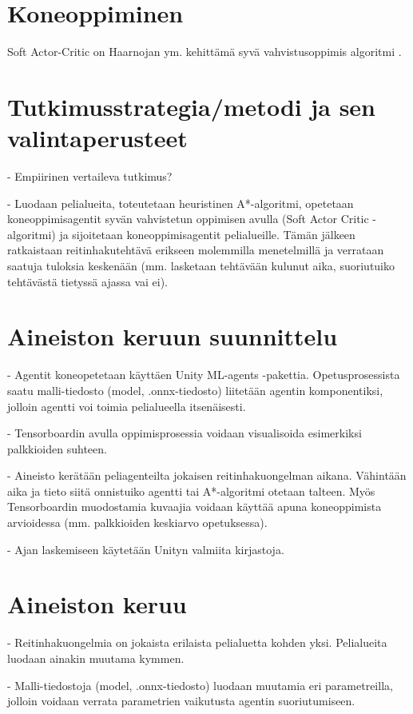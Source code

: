 \documentclass[utf8]{gradu3}
\begin{document}
\chapter{Koneoppiminen}

Soft Actor-Critic on Haarnojan ym. kehittämä syvä vahvistusoppimis algoritmi \parencite{haarnoja2018soft}. 

\chapter{Tutkimusstrategia/metodi ja sen valintaperusteet}

- Empiirinen vertaileva tutkimus?

- Luodaan pelialueita, toteutetaan heuristinen A*-algoritmi, opetetaan koneoppimisagentit syvän vahvistetun oppimisen avulla (Soft Actor Critic -algoritmi)
ja sijoitetaan koneoppimisagentit pelialueille. Tämän jälkeen ratkaistaan reitinhakutehtävä erikseen molemmilla menetelmillä ja verrataan saatuja tuloksia keskenään
(mm. lasketaan tehtävään kulunut aika, suoriutuiko tehtävästä tietyssä ajassa vai ei).

\chapter{Aineiston keruun suunnittelu}

- Agentit koneopetetaan käyttäen Unity ML-agents -pakettia. Opetusprosessista saatu malli-tiedosto (model, .onnx-tiedosto) liitetään agentin
komponentiksi, jolloin agentti voi toimia pelialueella itsenäisesti.

- Tensorboardin avulla oppimisprosessia voidaan visualisoida esimerkiksi palkkioiden suhteen.

- Aineisto kerätään peliagenteilta jokaisen reitinhakuongelman aikana. Vähintään aika ja tieto siitä onnistuiko agentti tai A*-algoritmi otetaan talteen.
Myös Tensorboardin muodostamia kuvaajia voidaan käyttää apuna koneoppimista arvioidessa (mm. palkkioiden keskiarvo opetuksessa).

- Ajan laskemiseen käytetään Unityn valmiita kirjastoja.

\chapter{Aineiston keruu}

- Reitinhakuongelmia on jokaista erilaista pelialuetta kohden yksi. Pelialueita luodaan ainakin muutama kymmen.

- Malli-tiedostoja (model, .onnx-tiedosto) luodaan muutamia eri parametreilla, jolloin voidaan verrata parametrien vaikutusta agentin suoriutumiseen.
\end{document}
